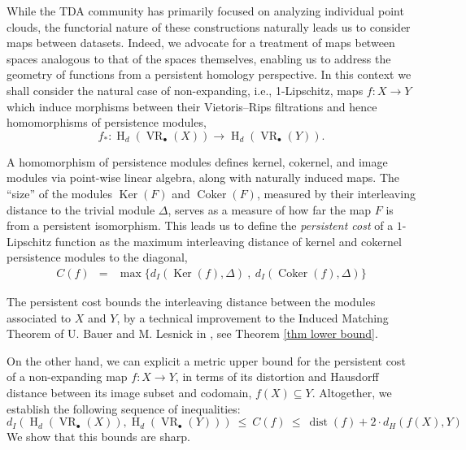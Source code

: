 \documentclass[11pt]{article}
\DeclareMathOperator{\VR}{VR}
\DeclareMathOperator{\dist}{dist}
\DeclareMathOperator{\Coker}{Coker}
\DeclareMathOperator{\Ker}{Ker}
\renewcommand{\H}{\operatorname{H}}
\newcommand{\bu}{_{\bullet}}
\begin{document}
While the TDA community has primarily focused on analyzing individual point clouds, the functorial nature of these constructions naturally leads us to consider maps between datasets.
Indeed, we advocate for a treatment of maps between spaces analogous to that of the spaces themselves, enabling us to address the geometry of functions from a persistent homology perspective.
In this context we shall consider the natural case of non-expanding, i.e., 1-Lipschitz, maps $f:X\to Y$ which induce morphisms between their Vietoris–Rips filtrations and hence homomorphisms of persistence modules, 
\[ f_{*}:\H_d(\VR\bu(X))\to \H_d(\VR\bu(Y)).\]

A homomorphism of persistence modules defines kernel, cokernel, and image modules via point-wise linear algebra, along with naturally induced maps.
The \enquote{size} of the modules $\Ker(F)$ and $\Coker(F)$, measured by their interleaving distance to the trivial module $\Delta$, serves as a measure of how far the map $F$ is from a persistent isomorphism. %
This leads us to define the \textit{persistent cost} of a $1$-Lipschitz function as the maximum interleaving distance of kernel and cokernel persistence modules to the diagonal, 
\begin{equation}\label{eq persistent cost}
\begin{array}{rcl}
C(f)   &  = & \max \big\{ d_I(\Ker(f), \Delta )~,~ d_I( \Coker(f), \Delta ) \big\}
\end{array}
\end{equation}

The persistent cost bounds the interleaving distance between the modules associated to $X$ and $Y$, by a technical improvement to the Induced Matching Theorem of U. Bauer and M. Lesnick in \cite{bauer2015induced}, see Theorem \ref{thm lower bound}.

On the other hand, we can explicit a metric upper bound for the persistent cost of a non-expanding map $f:X\to Y$, in terms of its distortion and Hausdorff distance between its image subset and codomain, $f(X)\subseteq Y$. Altogether, we establish the following sequence of inequalities:
 \begin{equation}\label{eq main inequality}
d_{I} \left( \H_d (\VR\bu(X) ), \H_d (\VR\bu(Y) ) \right) ~\leq ~C(f) ~\leq~  \dist(f) + 2\cdot d_H(f(X), Y) 
 \end{equation}
We show that this bounds are sharp. 
\end{document}
